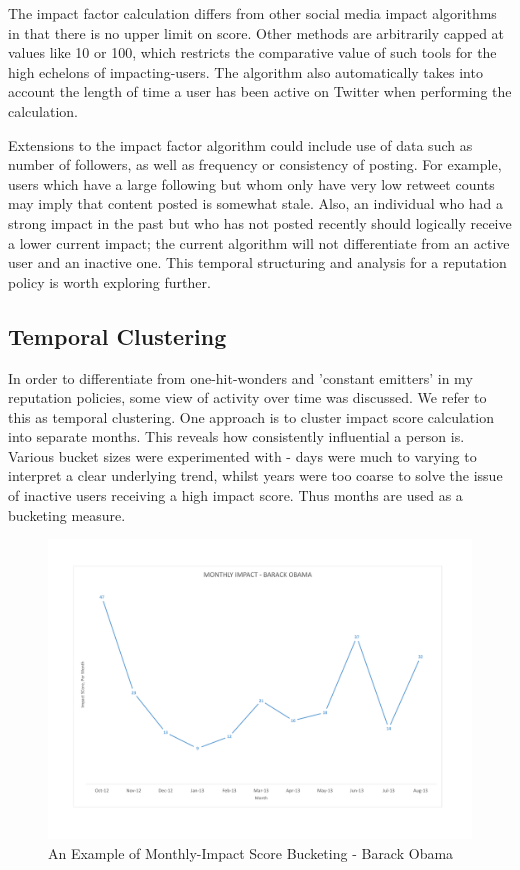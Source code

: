 The impact factor calculation differs from other social media impact algorithms in that there is no upper limit on score. Other methods are arbitrarily capped at values like 10 or 100, which restricts the comparative value of such tools for the high echelons of impacting-users. The algorithm also automatically takes into account the length of time a user has been active on Twitter when performing the calculation. 

Extensions to the impact factor algorithm could include use of data such as number of followers, as well as frequency or consistency of posting. For example, users which have a large following but whom only have very low retweet counts may imply that content posted is somewhat stale. Also, an individual who had a strong impact in the past but who has not posted recently should logically receive a lower current impact; the current algorithm will not differentiate from an active user and an inactive one. This temporal structuring and analysis for a reputation policy is worth exploring further. 

\subsection{Temporal Clustering}

In order to differentiate from one-hit-wonders and 'constant emitters' in my reputation policies, some view of activity over time was discussed. We refer to this as temporal clustering. One approach is to cluster impact score calculation into separate months. This reveals how consistently influential a person is. Various bucket sizes were experimented with - days were much to varying to interpret a clear underlying trend, whilst years were too coarse to solve the issue of inactive users receiving a high impact score. Thus months are used as a bucketing measure.

\begin{figure}[h!]
\centering
\includegraphics[width=500px]{Images/barack_obama_monthly_impact.pdf}
\caption{An Example of Monthly-Impact Score Bucketing - Barack Obama}
\end{figure}

